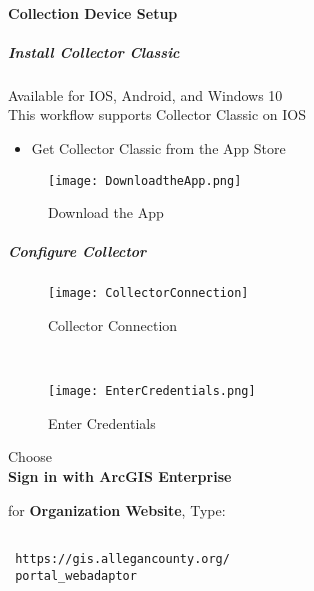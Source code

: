   \paragraph{Collection Device Setup}
  \subparagraph{Install Collector Classic}
	\noindent Available for IOS, Android, and Windows 10\\
	\noindent This workflow supports Collector Classic on IOS
  \begin{itemize}
  \item Get Collector Classic from the App Store
  \end{itemize}
  \begin{figure}[h!]
  \centering
      \texttt{[image: DownloadtheApp.png]}
  \caption{Download the App}
  \end{figure}
  \clearpage
  \subparagraph[Configure Collector]{\Large Configure Collector}
  \begin{wrapfigure}{r}{0.5\textwidth}
  \centering
  \texttt{[image: CollectorConnection]}
  \caption{Collector Connection}

  \HRule \\[.4cm] %
  \vspace{.1in}

      \texttt{[image: EnterCredentials.png]}
  \vspace{-.1in}

  \caption{Enter Credentials}
  \end{wrapfigure}

  Choose\\
  \noindent \textbf{Sign in with ArcGIS Enterprise}
  
 \vspace{.25in}
  
 for \textbf{Organization Website}, Type:
  
 \vspace{.1in}

 \begin{verbatim}

 https://gis.allegancounty.org/
 portal_webadaptor

 \end{verbatim}

  \vspace{.25in}

 \vspace{2in}

